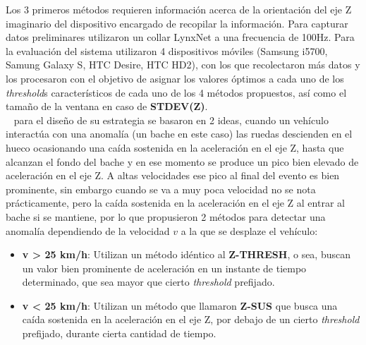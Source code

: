 Los 3 primeros métodos requieren información acerca de la orientación del eje Z imaginario del dispositivo encargado de recopilar la información. 
Para capturar datos preliminares utilizaron un collar LynxNet a una frecuencia de 100Hz. Para la evaluación del sistema utilizaron 4 dispositivos
móviles (Samsung i5700, Samung Galaxy S, HTC Desire, HTC HD2), con los que recolectaron más datos y los procesaron con el objetivo de asignar los 
valores óptimos a cada uno de los \emph{threshold}s característicos de cada uno de los 4 métodos propuestos, así como el tamaño de la ventana en caso de 
\textbf {STDEV(Z)}.\\

~\textcite{mohan2008nericell} para el diseño de su estrategia se basaron en 2 ideas, cuando un vehículo interactúa con una
anomalía (un bache en este caso) las ruedas descienden en el hueco ocasionando una caída sostenida en la aceleración en el eje Z,
hasta que alcanzan el fondo del bache y en ese momento se produce un pico bien elevado de aceleración en el eje Z. A altas velocidades
ese pico al final del evento es bien prominente, sin embargo cuando se va a muy poca velocidad no se nota prácticamente, pero la caída
sostenida en la aceleración en el eje Z al entrar al bache si se mantiene, por lo que propusieron 2 métodos para detectar una anomalía
dependiendo de la velocidad $v$ a la que se desplaze el vehículo:\\

\begin{itemize}
	\item \textbf {v > 25 km/h}:  Utilizan un método idéntico al \textbf {Z-THRESH}, o sea, buscan un valor bien prominente de
		aceleración en un instante de tiempo determinado, que sea mayor que cierto \emph{threshold} prefijado.\\
	\item \textbf {v < 25 km/h}:  Utilizan un método que llamaron \textbf {Z-SUS} que busca una caída sostenida en la aceleración
		en el eje Z, por debajo de un cierto \emph{threshold} prefijado, durante cierta cantidad de tiempo.\\
\end{itemize}

